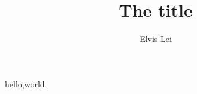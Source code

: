 \documentclass[•]{article}
\author{Elvis Lei}
\title{The title}
\begin{document}
	\maketitle
		hello,world	%
\end{document}
